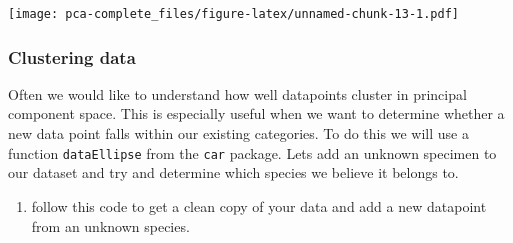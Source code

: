 \documentclass[]{article}
\newenvironment{Shaded}{\begin{snugshade}}{\end{snugshade}}
\newcommand{\DataTypeTok}[1]{\textcolor[rgb]{0.13,0.29,0.53}{#1}}
\newcommand{\DecValTok}[1]{\textcolor[rgb]{0.00,0.00,0.81}{#1}}
\newcommand{\KeywordTok}[1]{\textcolor[rgb]{0.13,0.29,0.53}{\textbf{#1}}}
\newcommand{\NormalTok}[1]{#1}
\newcommand{\OperatorTok}[1]{\textcolor[rgb]{0.81,0.36,0.00}{\textbf{#1}}}
\newcommand{\StringTok}[1]{\textcolor[rgb]{0.31,0.60,0.02}{#1}}
\providecommand{\tightlist}{%
  \setlength{\itemsep}{0pt}\setlength{\parskip}{0pt}}
\begin{document}
\begin{Shaded}
\end{Shaded}

\texttt{[image: pca-complete\_files/figure-latex/unnamed-chunk-13-1.pdf]}

\hypertarget{clustering-data}{%
\subsubsection{Clustering data}\label{clustering-data}}

Often we would like to understand how well datapoints cluster in
principal component space. This is especially useful when we want to
determine whether a new data point falls within our existing categories.
To do this we will use a function \texttt{dataEllipse} from the
\texttt{car} package. Lets add an unknown specimen to our dataset and
try and determine which species we believe it belongs to.

\begin{enumerate}
\def\labelenumi{\arabic{enumi})}
\setcounter{enumi}{10}
\tightlist
\item
  follow this code to get a clean copy of your data and add a new
  datapoint from an unknown species.
\end{enumerate}
\end{document}
